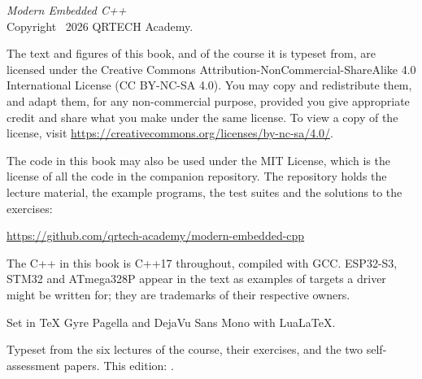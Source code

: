 \thispagestyle{empty}
\vspace*{\fill}
{\small
\noindent\textit{Modern Embedded C++}\\
Copyright \textcopyright\ 2026 QRTECH Academy.

\medskip
\noindent The text and figures of this book, and of the course it is typeset from, are licensed
under the Creative Commons Attribution-NonCommercial-ShareAlike 4.0 International License
(CC BY-NC-SA 4.0). You may copy and redistribute them, and adapt them, for any non-commercial
purpose, provided you give appropriate credit and share what you make under the same license. To
view a copy of the license, visit \url{https://creativecommons.org/licenses/by-nc-sa/4.0/}.

\medskip
\noindent The code in this book may also be used under the MIT License, which is the license of all
the code in the companion repository. The repository holds the lecture material, the example
programs, the test suites and the solutions to the exercises:

\medskip
\noindent\url{https://github.com/qrtech-academy/modern-embedded-cpp}

\medskip
\noindent The C++ in this book is C++17 throughout, compiled with GCC. ESP32-S3, STM32 and
ATmega328P appear in the text as examples of targets a driver might be written for; they are
trademarks of their respective owners.

\medskip
\noindent Set in TeX Gyre Pagella and DejaVu Sans Mono with Lua\LaTeX.

\medskip
\noindent\textcolor{muted}{Typeset from the six lectures of the course, their exercises, and the
two self-assessment papers. This edition: \bookedition.}
\par}
\cleardoublepage
